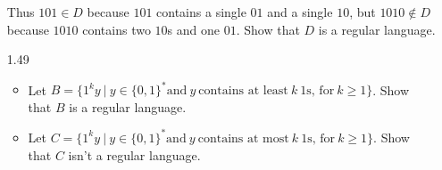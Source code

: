\begin{enumerate}
            Thus $101 \in D$ because $101$ contains a single $01$ and a single $10$, but $1010 \notin D$
            because $1010$ contains two $10$s and one $01$. Show that $D$ is a regular language.
      \item [1.49]
      
                  \begin{itemize}
                  \item Let $B =\{1^ky~|~ y \in \{0,1\}^\ast \text{and} ~y~ \text{contains at least}~ k~ 1\text{s, for}~ k \ge 1\}$. Show that $B$ is a regular language.
                  \item Let $C =\{1^ky~|~y \in\{0,1\}^\ast \text{and}~ y ~\text{contains at most} ~k~ 1\text{s, for}~ k \ge 1\}$. Show that $C$ isn’t a regular language.
            \end{itemize}
\end{enumerate}
